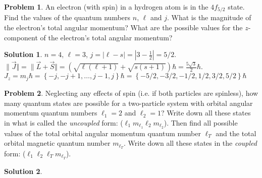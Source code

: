 \documentclass[10pt]{article}
\theoremstyle{definition}
\newtheorem{problem}{Problem}
\newtheorem{soln}{Solution}
\begin{document}
\begin{problem}
An electron (with spin) in a hydrogen atom is in the $4f_{5/2}$ state. Find the values of the quantum numbers
$n$, $\ell$ and $j$. What is the magnitude of the electron's total angular momentum? What are the possible values
for the $z$-component of the electron's total angular momentum?
\end{problem}
\begin{soln}
  $n=4$, $\ell=3$, $j=\left|\ell-s\right|=\left|3-\frac{1}{2}\right|=5/2$.
  $\| \vec{J}\Vert =\| \vec{L}+ \vec{S}\Vert=\left(\sqrt{\ell(\ell+1)}+\sqrt{s(s+1)}\right)\hbar=\frac{5\sqrt{3}}{2}\hbar$.
  $J_z=m_j\hbar=\left\{-j,-j+1,\dots, j-1, j\right\}\hbar=\left\{-5/2,-3/2,-1/2, 1/2, 3/2, 5/2\right\}\hbar$
\end{soln}

\begin{problem}
Neglecting any effects of spin (i.e. if both particles are spinless), how many quantum states are possible
for a two-particle system with orbital angular momentum quantum numbers $\ell_1=2$ and $\ell_2=1$? Write down
all these states in what is called the \emph{uncoupled} form: ($\ell_1m_{\ell_1}\ell_2m_{\ell_2}$). Then find all possible values of the
total orbital angular momentum quantum number $\ell_T$ and the total orbital magnetic quantum number $m_{\ell_T}$. Write down all these states
in the \emph{coupled} form: ($\ell_1\ell_2\ell_Tm_{\ell_T}$).
\end{problem}
\begin{soln}
\end{soln}
\end{document}
